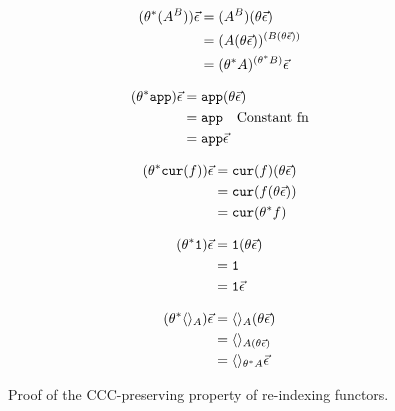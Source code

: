 \begin{figure}
\begin{framed}
                \begin{minipage}{.45\linewidth}
                    \begin{align*}
                        (\theta^*(A^B))\vec{\epsilon} & = (A^B)(\theta\vec{\epsilon})\\
                         & = (A (\theta\vec{\epsilon}))^{(B (\theta\vec{\epsilon}))}\\
                         & = (\theta^* A)^{(\theta^* B)}\vec{\epsilon}\\
                    \end{align*}                
                \end{minipage}
                \quad
                \begin{minipage}{.45\linewidth}
                    \begin{align*}
                    (\theta^* \texttt{app})\vec{\epsilon} & = \texttt{app}(\theta\vec{\epsilon})\\
                    & = \texttt{app} \quad\text{Constant fn}\\
                    & = \texttt{app}\vec{\epsilon}
                \end{align*}
                \end{minipage}
    
            \begin{minipage}{.45\linewidth}
                \begin{align*}
                    (\theta^*\texttt{cur}(f))\vec{\epsilon} & = \texttt{cur}(f)(\theta\vec{\epsilon})\\
                    & = \texttt{cur}(f(\theta\vec{\epsilon}))\\
                    & = \texttt{cur}(\theta^* f)
                \end{align*}             
            \end{minipage}
            \quad
            \begin{minipage}{.45\linewidth}
                \begin{align*}
                    (\theta^* \texttt{1})\vec{\epsilon} & = \texttt{1}(\theta\vec{\epsilon})\\
                    & = \texttt{1} \\
                    & = \texttt{1} \vec{\epsilon}\\
                \end{align*}
            \end{minipage}      
            
            \begin{minipage}{\linewidth}
                \begin{align*}
                    (\theta^*\langle\rangle_{A})\vec{\epsilon} & = \langle\rangle_{A}(\theta\vec{\epsilon})\\
                    & = \langle\rangle_{A(\theta\vec{\epsilon})}\\
                    & = \langle\rangle_{\theta^* A}\vec{\epsilon}
                \end{align*}
            \end{minipage}        
        \end{framed}
        
        \caption{Proof of the CCC-preserving property of re-indexing functors.}
        \label{PreservesCCC}
    \end{figure}
    
